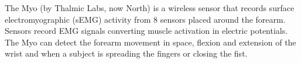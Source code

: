 \documentclass{article}
\begin{document}
The Myo (by Thalmic Labs, now North) \cite{northwebsite} is a wireless sensor that records surface electromyographic (sEMG) activity from 8 sensors placed around the forearm. Sensors record EMG signals converting muscle activation in electric potentials. The Myo can detect the forearm movement in space, flexion and extension of the wrist and when a subject is spreading the fingers or closing the fist. %
\end{document}
